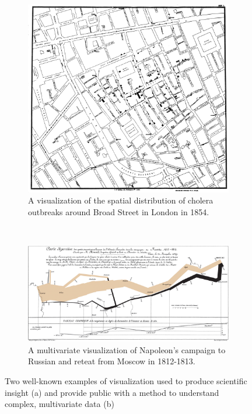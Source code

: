\begin{figure}
  \centering
  \begin{subfigure}{\abtwoimagewidth}
    \includegraphics[width=\abfboximagewidth]{figures/motivation/cholera.jpg}
    \caption{A visualization of the spatial distribution of cholera outbreaks around Broad Street in London in 1854.}
    \label{fig:motivation:example:cholera}
  \end{subfigure}
  ~
  \begin{subfigure}{\abtwoimagewidth}
    \includegraphics[width=\abfboximagewidth]{figures/motivation/napoleon.png}
    \caption{A multivariate visualization of Napoleon's campaign to Russian and reteat from Moscow in 1812-1813.}
    \label{fig:motivation:example:napoleon}
  \end{subfigure}
  \caption{Two well-known examples of visualization used to produce scientific insight (a) and provide public with a method to understand complex, multivariate data (b)}
  \label{fig:motivation:example}
\end{figure}

